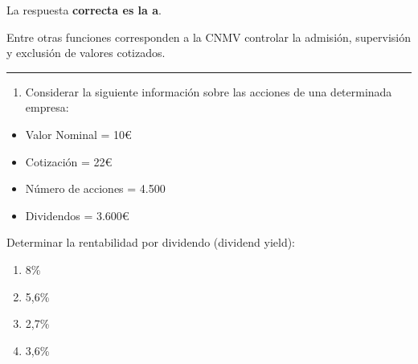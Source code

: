 \documentclass[
  letterpaper,
  DIV=11,
  numbers=noendperiod]{scrreprt}
\providecommand{\tightlist}{%
  \setlength{\itemsep}{0pt}\setlength{\parskip}{0pt}}\usepackage{longtable,booktabs,array}
\begin{document}
\begin{tcolorbox}[enhanced jigsaw, left=2mm, opacityback=0, colback=white, breakable, arc=.35mm, bottomrule=.15mm, rightrule=.15mm, toprule=.15mm, leftrule=.75mm, colframe=quarto-callout-tip-color-frame]
\begin{minipage}[t]{5.5mm}
\textcolor{quarto-callout-tip-color}{\faLightbulb}
\end{minipage}%
\begin{minipage}[t]{\textwidth - 5.5mm}

La respuesta \textbf{correcta es la a}.

Entre otras funciones corresponden a la CNMV controlar la admisión,
supervisión y exclusión de valores cotizados.

\end{minipage}%
\end{tcolorbox}

\begin{center}\rule{0.5\linewidth}{0.5pt}\end{center}

\begin{enumerate}
\def\labelenumi{\arabic{enumi}.}
\setcounter{enumi}{73}
\tightlist
\item
  Considerar la siguiente información sobre las acciones de una
  determinada empresa:
\end{enumerate}

\begin{itemize}
\item
  Valor Nominal = 10€
\item
  Cotización = 22€
\item
  Número de acciones = 4.500
\item
  Dividendos = 3.600€
\end{itemize}

Determinar la rentabilidad por dividendo (dividend yield):

\begin{enumerate}
\def\labelenumi{\alph{enumi}.}
\item
  8\%
\item
  5,6\%
\item
  2,7\%
\item
  3,6\%
\end{enumerate}
\end{document}
